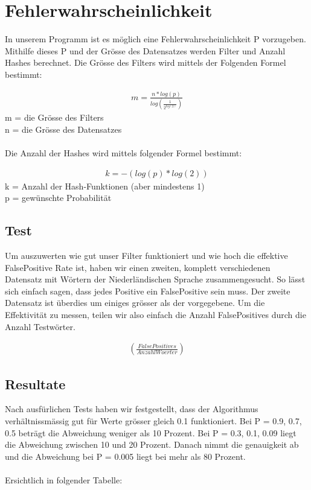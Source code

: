 \documentclass[11pt]{article}
\begin{document}
    \section{Fehlerwahrscheinlichkeit}
    In unserem Programm ist es m{\"o}glich eine Fehlerwahrscheinlichkeit P vorzugeben.
    Mithilfe dieses P und der Gr{\"o}sse des Datensatzes werden Filter und Anzahl Hashes berechnet.
    Die Gr{\"o}sse des Filters wird mittels der Folgenden Formel bestimmt:

    \begin{align*}
        m = \frac{n * log(p)}{log(\frac{1}{2^{log(2)}})}
    \end{align*}
    \smallskip
    m = die Gr{\"o}sse des Filters
    \\
    n = die Gr{\"o}sse des Datensatzes
    \\
    \\
    Die Anzahl der Hashes wird mittels folgender Formel bestimmt:

    \begin{align*}
        k = -(log(p) * log(2))
    \end{align*}
    \smallskip
    k = Anzahl der Hash-Funktionen (aber mindestens 1)
    \\
    p = gew{\"u}nschte Probabilit{\"a}t
    \medskip

    \subsection{Test}
    Um auszuwerten wie gut unser Filter funktioniert und wie hoch die effektive FalsePositive Rate ist,
    haben wir einen zweiten, komplett verschiedenen Datensatz mit W{\"o}rtern der Niederl{\"a}ndischen Sprache zusammengesucht.
    So l{\"a}sst sich einfach sagen, dass jedes Positive ein FalsePositive sein muss. Der zweite Datensatz ist {\"u}berdies um einiges
    gr{\"o}sser als der vorgegebene. Um die Effektivit{\"a}t zu messen, teilen wir also einfach die Anzahl FalsePositives durch die Anzahl
    Testw{\"o}rter.

    \begin{align*}
    (\frac{False Positives}{Anzahl Woerter})
    \end{align*}

    \newpage
    \subsection{Resultate}
    Nach ausf{\"u}rlichen Tests haben wir festgestellt, dass der Algorithmus verh{\"a}ltnissm{\"a}ssig  gut f{\"u}r Werte gr{\"o}sser gleich 0.1 funktioniert.
    \newline
    Bei P = 0.9, 0.7, 0.5 betr{\"a}gt die Abweichung weniger als 10 Prozent.
    \newline
    Bei P = 0.3, 0.1, 0.09 liegt die Abweichung zwischen 10 und 20 Prozent.
    \newline
    Danach nimmt die genauigkeit ab und die Abweichung bei P = 0.005 liegt bei mehr als 80 Prozent.
    \\
    \\
    Ersichtlich in folgender Tabelle:
    \\
\end{document}
